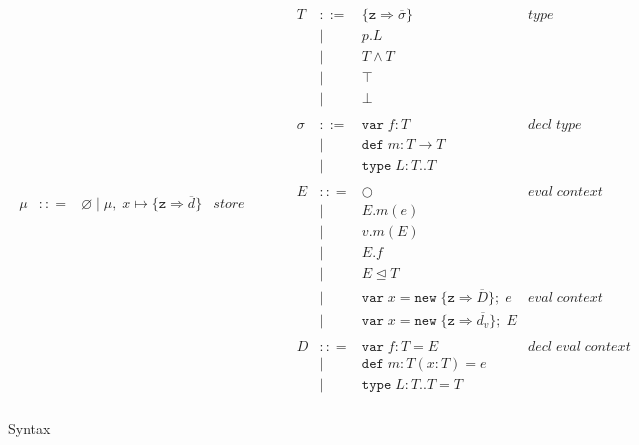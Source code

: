 \documentclass{llncs}
\begin{document}
\begin{figure}[h]
\[\begin{array}{lll}
\begin{array}{lllr}
&&\\
\mu & :: = & \varnothing \; | \; \mu,\; x \mapsto \{\texttt{z} \Rightarrow \overline{d}\} & store \\
\end{array}
& ~~~~~~
&
\begin{array}{lllr}
T & ::= & \{\texttt{z} \Rightarrow \overline{\sigma}\} & type \\
& | & p.L &\\
& | & T \wedge T & \\
& | & \top & \\
& | & \bot & \\
&&\\
\sigma & ::= & \texttt{var} \; f:T & decl \; type\\
       & |   & \texttt{def} \; m:T \rightarrow T \\
		 & |   & \texttt{type} \; L : T .. T &\\
&&\\
E & :: = & \bigcirc & eval \; context\\
       & | & E.m(e)\\
       & | & v.m(E)\\
       & | & E.f\\
       & | & E \unlhd T\\
       & | & \texttt{var} \; x = \texttt{new} \; \{\texttt{z} \Rightarrow \overline{D}\}; \; e & eval \; context \\
       & | & \texttt{var} \; x = \texttt{new} \; \{\texttt{z} \Rightarrow \overline{d_v}\}; \; E& \\
&&\\
D & :: = & \texttt{var} \; f : T = E & decl \; eval \; context \\
  & |   & \texttt{def} \; m : T(x:T) = e &\\
  & |   & \texttt{type} \; L : T .. T = T &\\
\end{array}
\end{array}
\]
\caption{Syntax}
\label{f:syntax}
\end{figure}
\end{document}
